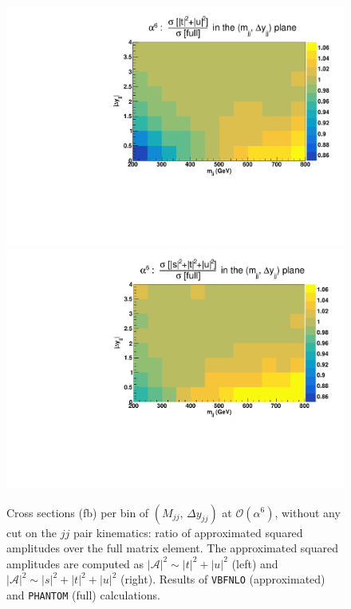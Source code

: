 \begin{figure}[hbt]
\centering
\includegraphics[scale=0.395]{figures/scanfigures/ratio_tu.pdf}
\includegraphics[scale=0.395]{figures/scanfigures/ratio_stu.pdf}
\caption{Cross sections (fb) per bin of $(M_{jj},\,\Delta y_{jj})$ at $\mathcal{O}(\alpha^6)$, without any cut on the $jj$ pair kinematics: ratio of approximated squared amplitudes over the full matrix element. The approximated squared amplitudes are computed as $|\mathcal{A}|^2 \sim |t|^2 + |u|^2$ (left) and $|\mathcal{A}|^2 \sim |s|^2 + |t|^2 + |u|^2$ (right). Results of \texttt{VBFNLO} (approximated) and \texttt{PHANTOM} (full) calculations.}\label{fig:ratio2d_LO}
\end{figure}

